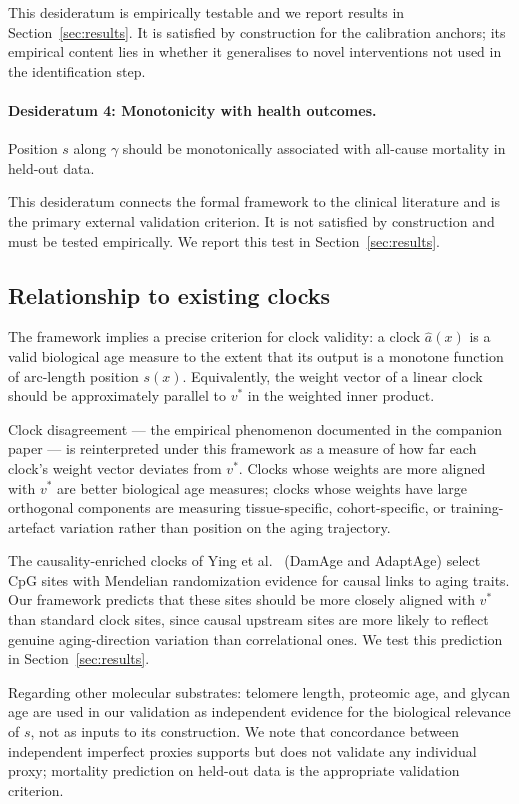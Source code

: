 This desideratum is empirically testable and we report results in
Section~\ref{sec:results}. It is satisfied by construction for the calibration
anchors; its empirical content lies in whether it generalises to novel interventions
not used in the identification step.

\paragraph{Desideratum 4: Monotonicity with health outcomes.}
Position $s$ along $\gamma$ should be monotonically associated with all-cause
mortality in held-out data.

This desideratum connects the formal framework to the clinical literature and is the
primary external validation criterion. It is not satisfied by construction and must
be tested empirically. We report this test in Section~\ref{sec:results}.

\subsection{Relationship to existing clocks}
\label{sec:clockrelationship}

The framework implies a precise criterion for clock validity: a clock $\hat{a}(x)$
is a valid biological age measure to the extent that its output is a monotone
function of arc-length position $s(x)$. Equivalently, the weight vector of a linear
clock should be approximately parallel to $v^*$ in the weighted inner product.

Clock disagreement --- the empirical phenomenon documented in the companion paper
\cite{vinogradova2026desiderata} --- is reinterpreted under this framework as
a measure of how far each clock's weight vector deviates from $v^*$. Clocks whose
weights are more aligned with $v^*$ are better biological age measures; clocks whose
weights have large orthogonal components are measuring tissue-specific, cohort-specific,
or training-artefact variation rather than position on the aging trajectory.

The causality-enriched clocks of Ying et al.\ \cite{ying2024} (DamAge and AdaptAge)
select CpG sites with Mendelian randomization evidence for causal links to aging
traits. Our framework predicts that these sites should be more closely aligned with
$v^*$ than standard clock sites, since causal upstream sites are more likely to
reflect genuine aging-direction variation than correlational ones. We test this
prediction in Section~\ref{sec:results}.

Regarding other molecular substrates: telomere length, proteomic age, and glycan
age are used in our validation as independent evidence for the biological relevance
of $s$, not as inputs to its construction. We note that concordance between
independent imperfect proxies supports but does not validate any individual proxy;
mortality prediction on held-out data is the appropriate validation criterion.
